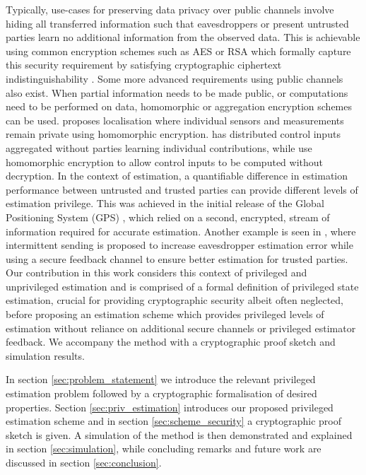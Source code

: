 \documentclass[letterpaper, 10 pt, conference]{IEEEtran}
\theoremstyle{definition}
\theoremstyle{definition}
\theoremstyle{remark}
\begin{document}
Typically, use-cases for preserving data privacy over public channels involve hiding all transferred information such that eavesdroppers or present untrusted parties learn no additional information from the observed data. This is achievable using common encryption schemes such as AES \cite{gueronIntelAdvancedEncryption2010} or RSA \cite{rivestMethodObtainingDigital1978} which formally capture this security requirement by satisfying cryptographic ciphertext indistinguishability \cite{katzIntroductionModernCryptography2008}. Some more advanced requirements using public channels also exist. When partial information needs to be made public, or computations need to be performed on data, homomorphic or aggregation encryption schemes can be used. \cite{alanwarPrOLocResilientLocalization2017} proposes localisation where individual sensors and measurements remain private using homomorphic encryption. \cite{alexandruPrivateWeightedSum2020} has distributed control inputs aggregated without parties learning individual contributions, while \cite{alexandruEncryptedCooperativeControl2019,farokhiSecurePrivateControl2017} use homomorphic encryption to allow control inputs to be computed without decryption. In the context of estimation, a quantifiable difference in estimation performance between untrusted and trusted parties can provide different levels of estimation privilege. This was achieved in the initial release of the Global Positioning System (GPS) \cite{grovesPrinciplesGNSSInertial2015}, which relied on a second, encrypted, stream of information required for accurate estimation. Another example is seen in \cite{leongTransmissionSchedulingRemote2019}, where intermittent sending is proposed to increase eavesdropper estimation error while using a secure feedback channel to ensure better estimation for trusted parties. Our contribution in this work considers this context of privileged and unprivileged estimation and is comprised of a formal definition of privileged state estimation, crucial for providing cryptographic security albeit often neglected, before proposing an estimation scheme which provides privileged levels of estimation without reliance on additional secure channels or privileged estimator feedback. We accompany the method with a cryptographic proof sketch and simulation results.

In section \ref{sec:problem_statement} we introduce the relevant privileged estimation problem followed by a cryptographic formalisation of desired properties. Section \ref{sec:priv_estimation} introduces our proposed privileged estimation scheme and in section \ref{sec:scheme_security} a cryptographic proof sketch is given. A simulation of the method is then demonstrated and explained in section \ref{sec:simulation}, while concluding remarks and future work are discussed in section \ref{sec:conclusion}.
\end{document}
